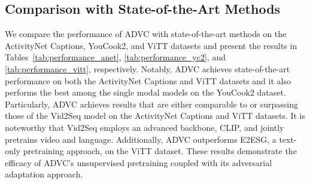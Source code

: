 
\subsection{Comparison with State-of-the-Art Methods}
We compare the performance of ADVC with state-of-the-art methods on the ActivityNet Captions, YouCook2, and ViTT datasets and present the results in Tables~\ref{tab:performance_anet}, \ref{tab:performance_yc2}, and \ref{tab:performance_vitt}, respectively.
Notably, ADVC achieves state-of-the-art performance on both the ActivityNet Captions and ViTT datasets and it also performs the best among the single modal models on the YouCook2 dataset.
Particularly, ADVC achieves results that are either comparable to or surpassing those of the Vid2Seq model on the ActivityNet Captions and ViTT datasets.
It is noteworthy that Vid2Seq employs an advanced backbone, CLIP, and jointly pretrains video and language.
Additionally, ADVC outperforms E2ESG, a text-only pretraining approach, on the ViTT dataset.
These results demonstrate the efficacy of ADVC's unsupervised pretraining coupled with its adversarial adaptation approach.

